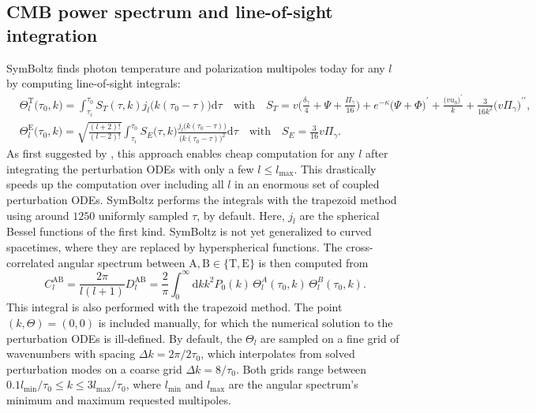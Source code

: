 \documentclass{aa}
\newcommand\lmax{l_\text{max}}
\begin{document}
\subsection{CMB power spectrum and line-of-sight integration}

SymBoltz finds photon temperature and polarization multipoles today for any $l$ by computing line-of-sight integrals:
\label{sec:cmb}
\begin{align*}
    &
    \Theta_l^\mathrm{T}\big(\tau_0,k\big) = \int_{\tau_i}^{\tau_0} S_T(\tau,k) j_l\big(k(\tau_0-\tau)\big) \mathrm{d}\tau \quad \text{with} \quad
    S_T = v \bigg( \frac{\delta_\gamma}{4} + \Psi + \frac{\Pi_\gamma}{16} \bigg) + e^{-\kappa} \big( \Psi + \Phi \big)^\prime + \frac{\big(v u_b\big)^\prime}{k} + \frac{3}{16k^2}\big(v \Pi_\gamma\big)^{\prime\prime}, \\
    &
    \Theta_l^\mathrm{E}\big(\tau_0,k\big) = \sqrt{\frac{(l+2)!}{(l-2)!}} \int_{\tau_i}^{\tau_0} S_E\big(\tau,k\big) \frac{j_l\big(k(\tau_0-\tau)\big)}{\big(k(\tau_0-\tau)\big)^2} \mathrm{d}\tau \quad \text{with} \quad 
    S_E = \frac{3}{16} v \Pi_\gamma .
\end{align*}
As first suggested by \citet{seljakLineSightApproach1996}, this approach enables cheap computation for any $l$ after integrating the perturbation ODEs with only a few $l \leq \lmax$.
This drastically speeds up the computation over including all $l$ in an enormous set of coupled perturbation ODEs.
SymBoltz performs the integrals with the trapezoid method using around $1250$ uniformly sampled $\tau$, by default.
Here, $j_l$ are the spherical Bessel functions of the first kind.
SymBoltz is not yet generalized to curved spacetimes, where they are replaced by hyperspherical functions.
The cross-correlated angular spectrum between $\mathrm{A},\mathrm{B} \in \{\mathrm{T},\mathrm{E}\}$ is then computed from
\begin{equation*}
    C_l^\mathrm{AB} = \frac{2\pi}{l(l+1)} D_l^\mathrm{AB} = \frac{2}{\pi} \int_0^\infty \mathrm{d}k k^2 P_0(k) \, \Theta_l^A(\tau_0,k) \, \Theta_l^B(\tau_0,k) .
\end{equation*}
This integral is also performed with the trapezoid method.
The point $(k, \Theta) = (0, 0)$ is included manually, for which the numerical solution to the perturbation ODEs is ill-defined.
By default, the $\Theta_l$ are sampled on a fine grid of wavenumbers with spacing $\Delta k = 2\pi/2 \tau_0$, which interpolates from solved perturbation modes on a coarse grid $\Delta k = 8/\tau_0$.
Both grids range between $0.1 l_\text{min}/\tau_0 \leq k \leq 3 l_\text{max}/\tau_0$, where $l_\text{min}$ and $l_\text{max}$ are the angular spectrum's minimum and maximum requested multipoles.
\end{document}
